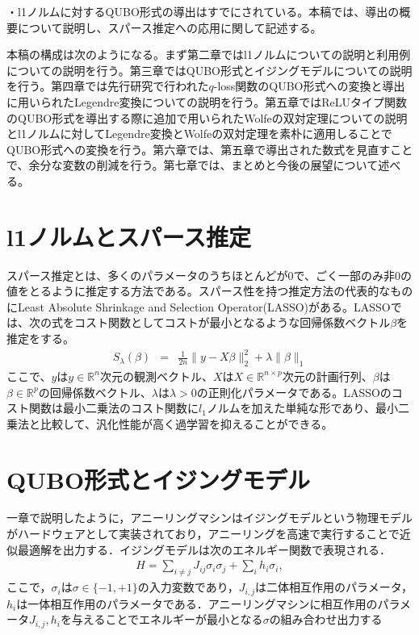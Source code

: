 \documentclass[paper]{ieicej}
\begin{document}
・l1ノルムに対するQUBO形式の導出はすでにされている。本稿では、導出の概要について説明し、スパース推定への応用に関して記述する。

本稿の構成は次のようになる。まず第二章ではl1ノルムについての説明と利用例についての説明を行う。第三章ではQUBO形式とイジングモデルについての説明を行う。第四章では先行研究で行われた$q$-loss関数のQUBO形式への変換と導出に用いられたLegendre変換についての説明を行う。第五章ではReLUタイプ関数のQUBO形式を導出する際に追加で用いられたWolfeの双対定理についての説明とl1ノルムに対してLegendre変換とWolfeの双対定理を素朴に適用しることでQUBO形式への変換を行う。第六章では、第五章で導出された数式を見直すことで、余分な変数の削減を行う。第七章では、まとめと今後の展望について述べる。


\section{l1ノルムとスパース推定}
スパース推定とは、多くのパラメータのうちほとんどが$0$で、ごく一部のみ非$0$の値をとるように推定する方法である。スパース性を持つ推定方法の代表的なものにLeast Absolute Shrinkage and Selection Operator(LASSO)がある。LASSOでは、次の式をコスト関数としてコストが最小となるような回帰係数ベクトル$\beta$を推定をする。
\begin{eqnarray}
 S_{\lambda}(\beta) &=& \frac{1}{2n}\|y-X\beta\|^{2}_{2} + \lambda\|\beta\|_{1} \label{lasso}
\end{eqnarray}
ここで、$y$は$y\in\mathbb{R}^{n}$次元の観測ベクトル、$X$は$X\in\mathbb{R}^{n\times p}$次元の計画行列、$\beta$は$\beta\in\mathbb{R}^{p}$の回帰係数ベクトル、$\lambda$は$\lambda >0$の正則化パラメータである。LASSOのコスト関数は最小二乗法のコスト関数に$l_{1}$ノルムを加えた単純な形であり、最小二乗法と比較して、汎化性能が高く過学習を抑えることができる。

\section{QUBO形式とイジングモデル}
一章で説明したように，アニーリングマシンはイジングモデルという物理モデルがハードウェアとして実装されており，アニーリングを高速で実行することで近似最適解を出力する．イジングモデルは次のエネルギー関数で表現される．
\begin{eqnarray}
 H = \sum_{i\neq j}{J_{ij}\sigma_{i}\sigma_{j}}+\sum_{i}{h_{i}\sigma_{i}}, \label{Ising_model}
\end{eqnarray}
ここで，$\sigma_{i}$は$\sigma \in \{ -1,+1\}$の入力変数であり，$J_{i,j}$は二体相互作用のパラメータ，$h_{i}$は一体相互作用のパラメータである．アニーリングマシンに相互作用のパラメータ$J_{i,j},h_{i}$を与えることでエネルギーが最小となる$\sigma$の組み合わせ出力する
\end{document}
